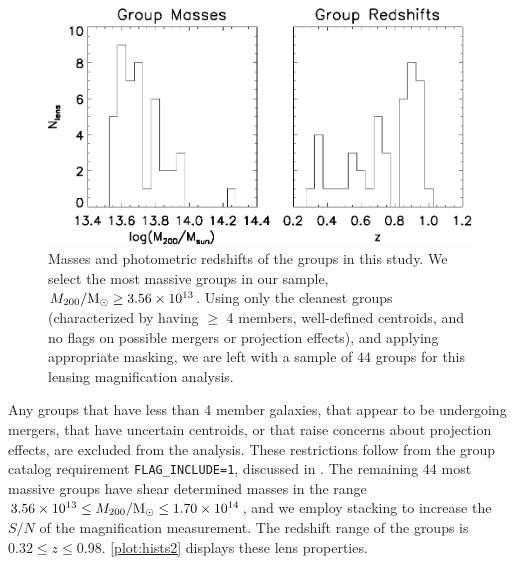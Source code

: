 \begin{figure}
\begin{center}
\includegraphics[scale=1.0]{plots_ch2/m200_zphot_histograms_44x.eps}
\caption[Masses and Redshifts of \ac{COSMOS} Groups]{Masses and photometric redshifts of the groups in this study.  We select the most massive groups in our sample, $M_{200} / {\rm M}_\odot \ge 3.56 \times 10^{13}$. Using only the cleanest groups (characterized by having $\ge$ 4 members, well-defined centroids, and no flags on possible mergers or projection effects), and applying appropriate masking, we are left with a sample of $44$ groups for this lensing magnification analysis.}
\label{plot:hists2}
\end{center}
\end{figure}

Any groups that have less than 4 member galaxies, that appear to be undergoing mergers, that have uncertain centroids, or that raise concerns about projection effects, are excluded from the analysis. These restrictions follow from the group catalog requirement \texttt{FLAG\_INCLUDE=1}, discussed in \citet{George11}. The remaining $44$ most massive groups have shear determined masses in the range $ 3.56 \times 10^{13} \le M_{200} / {\rm M}_\odot \le 1.70 \times 10^{14} $, and we employ stacking to increase the $S/N$ of the magnification measurement.  The redshift range of the groups is $ 0.32 \le z \le 0.98 $. \autoref{plot:hists2} displays these lens properties.

